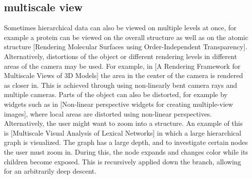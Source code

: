 \documentclass[review,journal]{vgtc}         %
\begin{document}
%
%




\subsection{multiscale view}
Sometimes hierarchical data can also be viewed on multiple levels at once, for example a protein can be viewed on the overall structure as well as on the atomic structure [Rendering Molecular Surfaces using Order-Independent Transparency]. 
Alternatively, distortions of the object or different rendering levels in different areas of the camera may be used. 
For example, in [A Rendering Framework for Multiscale Views of 3D Models] the area in the center of the camera is rendered as closer in. 
This is achieved through using non-linearly bent camera rays and multiple cameras. Parts of the object can also be distorted, for example by widgets such as in [Non-linear perspective widgets for creating multiple-view images], where local areas are distorted using non-linear perspectives. Alternatively, the user might want to zoom into a structure. An example of this is [Multiscale Visual Analysis of Lexical Networks] in which a large hierarchical graph is visualized. The graph has a large depth, and to investigate certain nodes the user must zoom in. During this, the node expands and changes color while its children become exposed. This is recursively applied down the branch, allowing for an arbitrarily deep descent.
\end{document}

